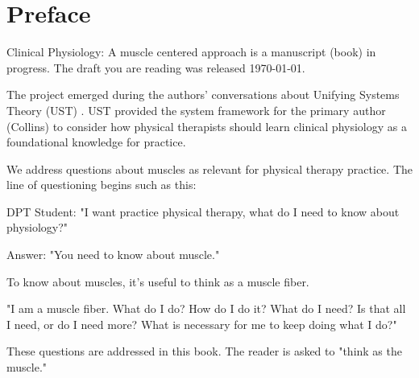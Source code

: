 \chapter*{Preface}


% 

Clinical Physiology: A muscle centered approach is a manuscript (book) in progress. The draft you are reading was released \today.

The project emerged during the authors' conversations about Unifying Systems Theory (UST) \cite{kahlen_perception_2017}. UST provided the system framework for the primary author (Collins) to consider how physical therapists should learn clinical physiology as a foundational knowledge for practice. 

We address questions about muscles as relevant for physical therapy practice. The line of questioning begins such as this: 

\vspace{5mm}

\noindent DPT Student: "I want practice physical therapy, what do I need to know about physiology?" 

\vspace{5mm}

\noindent Answer: "You need to know about muscle." 

\vspace{5mm}

\noindent To know about muscles, it's useful to think as a muscle fiber. 
\vspace{5mm}

\noindent "I am a muscle fiber. What do I do? How do I do it? What do I need? Is that all I need, or do I need more? What is necessary for me to keep doing what I do?"

\vspace{5mm}

\noindent These questions are addressed in this book. The reader is asked to "think as the muscle."

